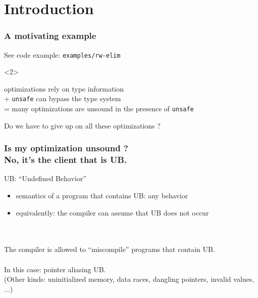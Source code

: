 \begin{frame}
    \titlepage
\end{frame}

\section{Introduction}


\begin{frame}[fragile,t]
    \frametitle{A motivating example}
    See code example: \texttt{examples/rw-elim}

    \begin{onlyenv}<2>
        \begin{block}{}
            optimizations rely on type information\\
            + \texttt{unsafe} can bypass the type system\\
            = many optimizations are unsound in the presence of \texttt{unsafe}
        \end{block}
        Do we have to give up on all these optimizations ?
    \end{onlyenv}
\end{frame}

\begin{frame}
    \frametitle{Is my optimization unsound ?\\No, it's the client that is UB.}
    UB: ``Undefined Behavior''
    \begin{itemize}
        \item semantics of a program that contains UB: any behavior
        \item equivalently: the compiler can assume that UB does not occur
    \end{itemize}~\\~\\

    The compiler is allowed to ``miscompile'' programs that contain UB.~\\~\\

    In this case: pointer aliasing UB.\\
    (Other kinds: uninitialized memory, data races, dangling pointers, invalid values, ...)
\end{frame}


